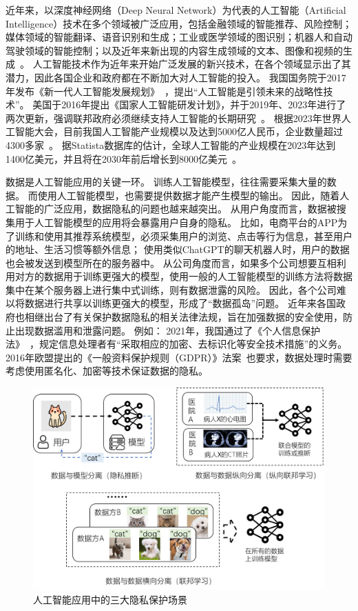 近年来，以深度神经网络（Deep Neural Network）为代表的人工智能（Artificial Intelligence）技术在多个领域被广泛应用，包括金融领域的智能推荐、风险控制；媒体领域的智能翻译、语音识别和生成；工业或医学领域的图识别；机器人和自动驾驶领域的智能控制；以及近年来新出现的内容生成领域的文本、图像和视频的生成~\cite{lecun2015deep_learning,zhang2021ai_survey,wang2023chatgpt_survey}。
%
人工智能技术作为近年来开始广泛发展的新兴技术，在各个领域显示出了其潜力，因此各国企业和政府都在不断加大对人工智能的投入。
%
我国国务院于2017年发布《新一代人工智能发展规划》~\cite{china2017ai_plan}，提出“人工智能是引领未来的战略性技术”。
%
美国于2016年提出《国家人工智能研发计划》，并于2019年、2023年进行了两次更新，强调联邦政府必须继续支持人工智能的长期研究~\cite{usa2023ai_plan}。
%
根据2023年世界人工智能大会，目前我国人工智能产业规模以及达到5000亿人民币，企业数量超过4300多家~\cite{2023china_ai_conf}。
%
据Statista数据库的估计，全球人工智能的产业规模在2023年达到1400亿美元，并且将在2030年前后增长到8000亿美元~。

%
数据是人工智能应用的关键一环。
%
训练人工智能模型，往往需要采集大量的数据。
而使用人工智能模型，也需要提供数据才能产生模型的输出。
%
因此，随着人工智能的广泛应用，数据隐私的问题也越来越突出。
%
从用户角度而言，数据被搜集用于人工智能模型的应用将会暴露用户自身的隐私。
%
比如，电商平台的APP为了训练和使用其推荐系统模型，必须采集用户的浏览、点击等行为信息，甚至用户的地址、生活习惯等额外信息；
使用类似ChatGPT的聊天机器人时，用户的数据也会被发送到模型所在的服务器中。
%
从公司角度而言，如果多个公司想要互相利用对方的数据用于训练更强大的模型，使用一般的人工智能模型的训练方法将数据集中在某个服务器上进行集中式训练，则有数据泄露的风险。
因此，各个公司难以将数据进行共享以训练更强大的模型，形成了“数据孤岛”问题。
%
近年来各国政府也相继出台了有关保护数据隐私的相关法律法规，旨在加强数据的安全使用，防止出现数据滥用和泄露问题。
%
例如：
2021年，我国通过了《个人信息保护法》~\cite{china_personal_information_protection}，规定信息处理者有“采取相应的加密、去标识化等安全技术措施”的义务。
2016年欧盟提出的《一般资料保护规则（GDPR）》法案~\cite{GDPR}也要求，数据处理时需要考虑使用匿名化、加密等技术保证数据的隐私。


\begin{figure}[h]
    \centering
    \includegraphics[width=1\linewidth]{Z_Resources/PPML-overview.png}
    \caption{人工智能应用中的三大隐私保护场景}
    \label{fig:intro:ppml-overview}
\end{figure}



